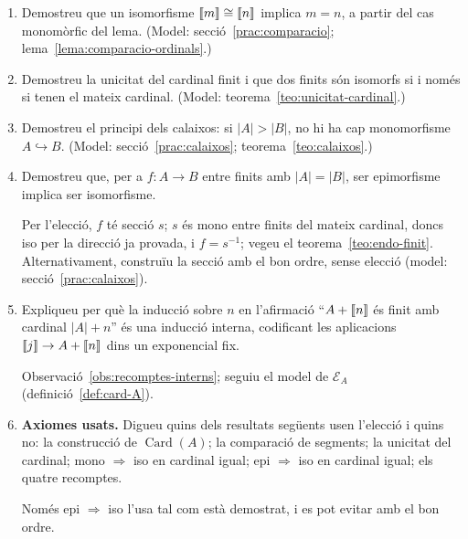 \begin{enumerate}[resume]
  \item Demostreu que un isomorfisme \(\llbracket m\rrbracket\cong\llbracket n\rrbracket\) implica \(m=n\), a partir del cas monomòrfic del lema. (Model: secció~\ref{prac:comparacio}; lema~\ref{lema:comparacio-ordinals}.)

  \item Demostreu la unicitat del cardinal finit i que dos finits són isomorfs si i només si tenen el mateix cardinal. (Model: teorema~\ref{teo:unicitat-cardinal}.)

  \item Demostreu el principi dels calaixos: si \(|A|>|B|\), no hi ha cap monomorfisme \(A\hookrightarrow B\). (Model: secció~\ref{prac:calaixos}; teorema~\ref{teo:calaixos}.)

  \item Demostreu que, per a \(f\colon A\to B\) entre finits amb \(|A|=|B|\), ser epimorfisme implica ser isomorfisme. \begin{indicacio}Per l'elecció, \(f\) té secció \(s\); \(s\) és mono entre finits del mateix cardinal, doncs iso per la direcció ja provada, i \(f=s^{-1}\); vegeu el teorema~\ref{teo:endo-finit}. Alternativament, construïu la secció amb el bon ordre, sense elecció (model: secció~\ref{prac:calaixos}).\end{indicacio}

  \item Expliqueu per què la inducció sobre \(n\) en l'afirmació \enquote{\(A+\llbracket n\rrbracket\) és finit amb cardinal \(|A|+n\)} és una inducció interna, codificant les aplicacions \(\llbracket j\rrbracket\to A+\llbracket n\rrbracket\) dins un exponencial fix. \begin{indicacio}Observació~\ref{obs:recomptes-interns}; seguiu el model de \(\mathcal E_A\) (definició~\ref{def:card-A}).\end{indicacio}

  \item \textbf{Axiomes usats.} Digueu quins dels resultats següents usen l'elecció i quins no: la construcció de \(\operatorname{Card}(A)\); la comparació de segments; la unicitat del cardinal; mono \(\Rightarrow\) iso en cardinal igual; epi \(\Rightarrow\) iso en cardinal igual; els quatre recomptes. \begin{indicacio}Només epi \(\Rightarrow\) iso l'usa tal com està demostrat, i es pot evitar amb el bon ordre.\end{indicacio}
\end{enumerate}

